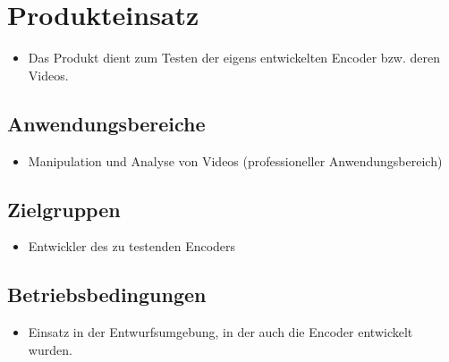 \section{Produkteinsatz}

\begin{itemize}
	\item Das Produkt dient zum Testen der eigens entwickelten Encoder bzw. deren Videos.
\end{itemize}

\subsection{Anwendungsbereiche}

\begin{itemize}
	\item Manipulation und Analyse von Videos (professioneller Anwendungsbereich)
\end{itemize}

\subsection{Zielgruppen}

\begin{itemize}
	\item Entwickler des zu testenden Encoders
\end{itemize}

\subsection{Betriebsbedingungen}

\begin{itemize}
	\item Einsatz in der Entwurfsumgebung, in der auch die Encoder entwickelt wurden.
\end{itemize}
